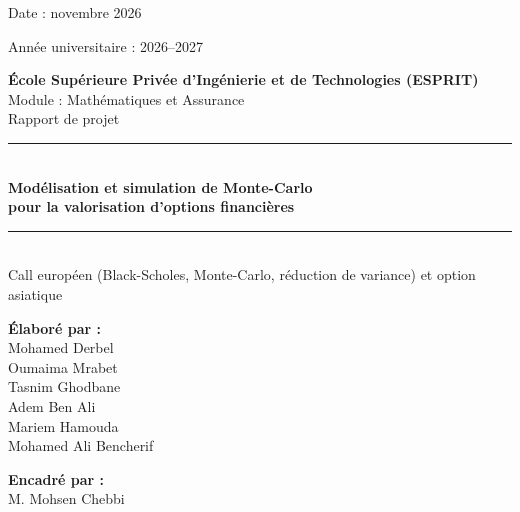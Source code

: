 \documentclass[11pt,a4paper]{report}
\begin{document}
\begin{titlepage}
\thispagestyle{empty}
\begin{minipage}{0.5\textwidth}\small Date : novembre 2026\end{minipage}%
\begin{minipage}{0.5\textwidth}\raggedleft\small Année universitaire : 2026--2027\end{minipage}

\vspace*{1.6cm}
\begin{center}
{\large\bfseries École Supérieure Privée d'Ingénierie et de Technologies (ESPRIT)}\\[0.3cm]
{\normalsize Module : Mathématiques et Assurance}\\[2.2cm]
{\Large Rapport de projet}\\[0.6cm]
\rule{\textwidth}{1pt}\\[0.4cm]
{\huge\bfseries\color{bleu} Modélisation et simulation de Monte-Carlo\\[0.2cm] pour la valorisation d'options financières}\\[0.3cm]
\rule{\textwidth}{1pt}\\[0.6cm]
{\large Call européen (Black-Scholes, Monte-Carlo, réduction de variance) et option asiatique}\\[2.4cm]
\begin{minipage}[t]{0.45\textwidth}\centering
\textbf{Élaboré par :}\\[0.2cm]
Mohamed Derbel\\ Oumaima Mrabet\\ Tasnim Ghodbane\\ Adem Ben Ali\\ Mariem Hamouda\\ Mohamed Ali Bencherif
\end{minipage}\hfill
\begin{minipage}[t]{0.45\textwidth}\centering
\textbf{Encadré par :}\\[0.2cm] M. Mohsen Chebbi
\end{minipage}
\end{center}
\end{titlepage}

\tableofcontents
\listoffigures
\listoftables
\cleardoublepage
{}









\appendix

\end{document}
